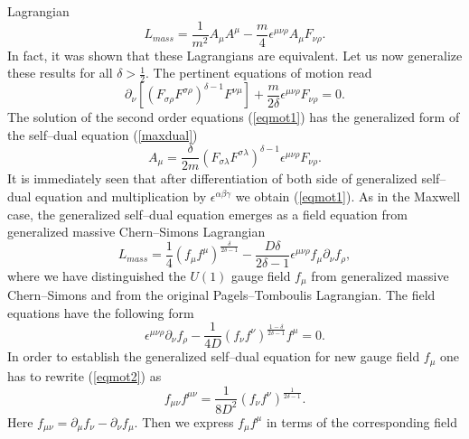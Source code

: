 \documentclass[a4 paper, 12 pt] {article}
\begin{document}
Lagrangian
\cite{Townsend}
\begin{equation}
L_{mass}=\frac{1}{m^2} A_{\mu }A^{\mu } -\frac{m}{4} \epsilon^{\mu \nu
\rho } A_{\mu } F_{\nu \rho}.
\label{maxproca}
\end{equation}
In fact, it was shown that these Lagrangians are equivalent. Let
us now generalize these results for all $\delta > \frac{1}{2}$.
The pertinent equations of motion read
\begin{equation}
\partial_{\nu } \left[ (F_{\sigma \rho }F^{\sigma \rho } )^{\delta -1} F^{\nu \mu
} \right] +\frac{m}{2 \delta } \epsilon^{\mu \nu \rho } F_{\nu \rho } =0.
\label{eqmot1}
\end{equation}
The solution of the second order equations (\ref{eqmot1}) has the
generalized form of the self--dual equation (\ref{maxdual})
\begin{equation}
A_{\mu } = \frac{\delta }{2m} (F_{\sigma \lambda }F^{\sigma \lambda }
)^{\delta -1} \epsilon^{\mu \nu
\rho } F_{\nu \rho }.
\label{selfdual}
\end{equation}
It is immediately seen that after differentiation of both side of
generalized self--dual equation and multiplication by $\epsilon^{\alpha
\beta \gamma}$ we obtain (\ref{eqmot1}). As in the Maxwell case, the
generalized self--dual equation emerges as a field equation from
generalized massive Chern--Simons Lagrangian
\begin{equation}
L_{mass}=\frac{1}{4} (f_{\mu} f^{\mu} )^{\frac{\delta }{2 \delta -1}} -
\frac{D \delta }{2\delta -1}
\epsilon^{\mu \nu \rho } f_{\mu } \partial_{\nu } f_{\rho },
\label{dual}
\end{equation}
where we have distinguished the $U(1)$ gauge field $f_{\mu }$ from
generalized massive Chern--Simons and from the original Pagels--Tomboulis
Lagrangian. The field equations have the following form
\begin{equation}
\epsilon^{\mu \nu \rho } \partial_{\nu } f_{\rho } - \frac{1}{4D}
(f_{\nu} f^{\nu} )^{\frac{1-\delta }{2 \delta -1}} f^{\mu }=0.
\label{eqmot2}
\end{equation}
In order to establish the generalized self--dual equation for new gauge
field $f_{\mu }$ one has to rewrite (\ref{eqmot2}) as
\begin{equation}
f_{\mu \nu } f^{\mu \nu } = \frac{1}{8D^2} (f_{\nu} f^{\nu} )^{\frac{1}{2
\delta -1}}.
\label{f}
\end{equation}
Here $f_{\mu \nu }= \partial_{\mu } f_{\nu } -\partial_{\nu } f_{\mu }$.
Then we express $f_{\mu } f^{\mu }$ in terms of the corresponding field
\end{document}
